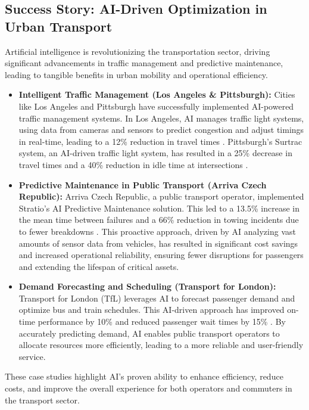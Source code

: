 \subsection{Success Story: AI-Driven Optimization in Urban Transport}
Artificial intelligence is revolutionizing the transportation sector, driving significant advancements in traffic management and predictive maintenance, leading to tangible benefits in urban mobility and operational efficiency.
\begin{itemize}
    \item \textbf{Intelligent Traffic Management (Los Angeles \& Pittsburgh):} Cities like Los Angeles and Pittsburgh have successfully implemented AI-powered traffic management systems. In Los Angeles, AI manages traffic light systems, using data from cameras and sensors to predict congestion and adjust timings in real-time, leading to a 12\% reduction in travel times \cite{Medium_Success_Traffic}. Pittsburgh's Surtrac system, an AI-driven traffic light system, has resulted in a 25\% decrease in travel times and a 40\% reduction in idle time at intersections \cite{Medium_Success_Traffic}.
    \item \textbf{Predictive Maintenance in Public Transport (Arriva Czech Republic):} Arriva Czech Republic, a public transport operator, implemented Stratio's AI Predictive Maintenance solution. This led to a 13.5\% increase in the mean time between failures and a 66\% reduction in towing incidents due to fewer breakdowns \cite{StratioAutomotive_Success}. This proactive approach, driven by AI analyzing vast amounts of sensor data from vehicles, has resulted in significant cost savings and increased operational reliability, ensuring fewer disruptions for passengers and extending the lifespan of critical assets.
    \item \textbf{Demand Forecasting and Scheduling (Transport for London):} Transport for London (TfL) leverages AI to forecast passenger demand and optimize bus and train schedules. This AI-driven approach has improved on-time performance by 10\% and reduced passenger wait times by 15\% \cite{Medium_Success_Traffic}. By accurately predicting demand, AI enables public transport operators to allocate resources more efficiently, leading to a more reliable and user-friendly service.
\end{itemize}
These case studies highlight AI's proven ability to enhance efficiency, reduce costs, and improve the overall experience for both operators and commuters in the transport sector.

